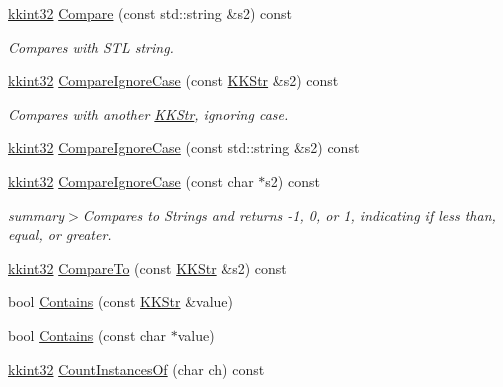 \begin{DoxyCompactItemize}
\item 
\hyperlink{namespace_k_k_b_a8fa4952cc84fda1de4bec1fbdd8d5b1b}{kkint32} \hyperlink{class_k_k_b_1_1_k_k_str_abe691ef6e98886554961cc40abfb4349}{Compare} (const std\+::string \&s2) const 
\begin{DoxyCompactList}\small\item\em Compares with S\+TL string. \end{DoxyCompactList}\item 
\hyperlink{namespace_k_k_b_a8fa4952cc84fda1de4bec1fbdd8d5b1b}{kkint32} \hyperlink{class_k_k_b_1_1_k_k_str_a3fd779d448f27e24170c9c05fca5208e}{Compare\+Ignore\+Case} (const \hyperlink{class_k_k_b_1_1_k_k_str}{K\+K\+Str} \&s2) const 
\begin{DoxyCompactList}\small\item\em Compares with another \hyperlink{class_k_k_b_1_1_k_k_str}{K\+K\+Str}, ignoring case. \end{DoxyCompactList}\item 
\hyperlink{namespace_k_k_b_a8fa4952cc84fda1de4bec1fbdd8d5b1b}{kkint32} \hyperlink{class_k_k_b_1_1_k_k_str_a45c0bf5d3c8691446824055edaa8cc50}{Compare\+Ignore\+Case} (const std\+::string \&s2) const 
\item 
\hyperlink{namespace_k_k_b_a8fa4952cc84fda1de4bec1fbdd8d5b1b}{kkint32} \hyperlink{class_k_k_b_1_1_k_k_str_a980dc8dd35b1d547ba4ad5654afe8d7d}{Compare\+Ignore\+Case} (const char $\ast$s2) const 
\begin{DoxyCompactList}\small\item\em summary$>$Compares to Strings and returns -\/1, 0, or 1, indicating if less than, equal, or greater. \end{DoxyCompactList}\item 
\hyperlink{namespace_k_k_b_a8fa4952cc84fda1de4bec1fbdd8d5b1b}{kkint32} \hyperlink{class_k_k_b_1_1_k_k_str_a44cdbebedf8286d99efa2370f901a09b}{Compare\+To} (const \hyperlink{class_k_k_b_1_1_k_k_str}{K\+K\+Str} \&s2) const 
\item 
bool \hyperlink{class_k_k_b_1_1_k_k_str_a69ab2a44ac643d6bfd2aba7f044aa4e5}{Contains} (const \hyperlink{class_k_k_b_1_1_k_k_str}{K\+K\+Str} \&value)
\item 
bool \hyperlink{class_k_k_b_1_1_k_k_str_a52e0a6975bebdcfcdcf3a4a8de9949f8}{Contains} (const char $\ast$value)
\item 
\hyperlink{namespace_k_k_b_a8fa4952cc84fda1de4bec1fbdd8d5b1b}{kkint32} \hyperlink{class_k_k_b_1_1_k_k_str_a08b9dcd254e64e4337008ab3007fdbc8}{Count\+Instances\+Of} (char ch) const 
\item 

\end{DoxyCompactItemize}
